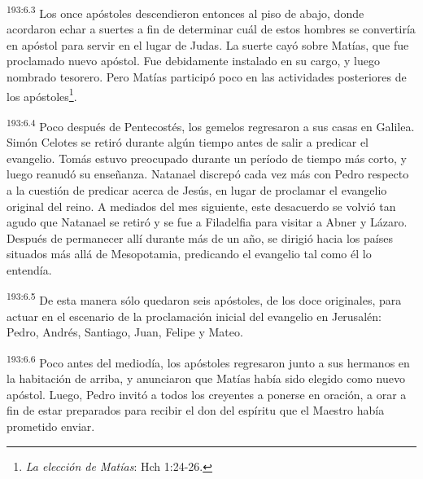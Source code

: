 \par
\textsuperscript{193:6.3} Los once apóstoles descendieron entonces al piso de abajo, donde acordaron echar a suertes a fin de determinar cuál de estos hombres se convertiría en apóstol para servir en el lugar de Judas. La suerte cayó sobre Matías, que fue proclamado nuevo apóstol. Fue debidamente instalado en su cargo, y luego nombrado tesorero. Pero Matías participó poco en las actividades posteriores de los apóstoles\footnote{\textit{La elección de Matías}: Hch 1:24-26.}.

\par
\textsuperscript{193:6.4} Poco después de Pentecostés, los gemelos regresaron a sus casas en Galilea. Simón Celotes se retiró durante algún tiempo antes de salir a predicar el evangelio. Tomás estuvo preocupado durante un período de tiempo más corto, y luego reanudó su enseñanza. Natanael discrepó cada vez más con Pedro respecto a la cuestión de predicar acerca de Jesús, en lugar de proclamar el evangelio original del reino. A mediados del mes siguiente, este desacuerdo se volvió tan agudo que Natanael se retiró y se fue a Filadelfia para visitar a Abner y Lázaro. Después de permanecer allí durante más de un año, se dirigió hacia los países situados más allá de Mesopotamia, predicando el evangelio tal como él lo entendía.

\par
\textsuperscript{193:6.5} De esta manera sólo quedaron seis apóstoles, de los doce originales, para actuar en el escenario de la proclamación inicial del evangelio en Jerusalén: Pedro, Andrés, Santiago, Juan, Felipe y Mateo.

\par
\textsuperscript{193:6.6} Poco antes del mediodía, los apóstoles regresaron junto a sus hermanos en la habitación de arriba, y anunciaron que Matías había sido elegido como nuevo apóstol. Luego, Pedro invitó a todos los creyentes a ponerse en oración, a orar a fin de estar preparados para recibir el don del espíritu que el Maestro había prometido enviar.